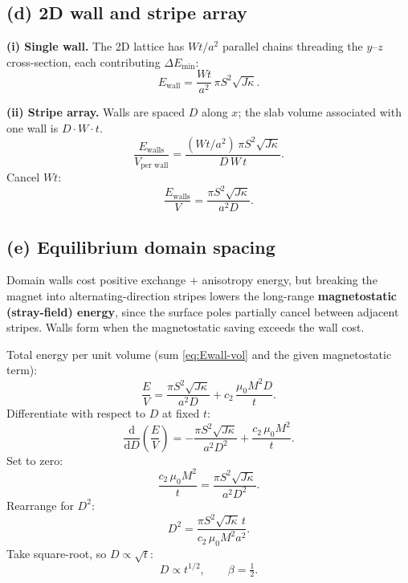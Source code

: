 \documentclass[11pt]{article}
\newcommand{\de}{\mathrm{d}}
\begin{document}
\subsection*{(d) 2D wall and stripe array}

\textbf{(i) Single wall.} The 2D lattice has $W t/a^2$ parallel chains threading the $y$--$z$ cross-section, each contributing $\Delta E_\text{min}$:
\[
\boxed{\;E_\text{wall} = \frac{Wt}{a^2}\,\pi S^2\sqrt{J\kappa}.\;}
\]

\textbf{(ii) Stripe array.} Walls are spaced $D$ along $x$; the slab volume associated with one wall is $D\cdot W\cdot t$.
\[
\frac{E_\text{walls}}{V_\text{per wall}} = \frac{(Wt/a^2)\,\pi S^2\sqrt{J\kappa}}{D\,W\,t}.
\]
Cancel $Wt$:
\begin{equation}
\boxed{\;\frac{E_\text{walls}}{V} = \frac{\pi S^2\sqrt{J\kappa}}{a^2 D}.\;}
\label{eq:Ewall-vol}
\end{equation}

\subsection*{(e) Equilibrium domain spacing}

Domain walls cost positive exchange + anisotropy energy, but breaking the magnet into alternating-direction stripes lowers the long-range \textbf{magnetostatic (stray-field) energy}, since the surface poles partially cancel between adjacent stripes. Walls form when the magnetostatic saving exceeds the wall cost.

Total energy per unit volume (sum \eqref{eq:Ewall-vol} and the given magnetostatic term):
\[
\frac{E}{V} = \frac{\pi S^2\sqrt{J\kappa}}{a^2 D} + c_2\,\frac{\mu_0 M^2 D}{t}.
\]
Differentiate with respect to $D$ at fixed $t$:
\[
\frac{\de}{\de D}\!\left(\frac{E}{V}\right) = -\frac{\pi S^2\sqrt{J\kappa}}{a^2 D^2} + \frac{c_2\,\mu_0 M^2}{t}.
\]
Set to zero:
\[
\frac{c_2\,\mu_0 M^2}{t} = \frac{\pi S^2\sqrt{J\kappa}}{a^2 D^2}.
\]
Rearrange for $D^2$:
\[
D^2 = \frac{\pi S^2\sqrt{J\kappa}\,t}{c_2\,\mu_0 M^2 a^2}.
\]
Take square-root, so $D\propto\sqrt{t}$:
\[
\boxed{\;D \propto t^{1/2},\qquad \beta = \tfrac12.\;}
\]
\end{document}
